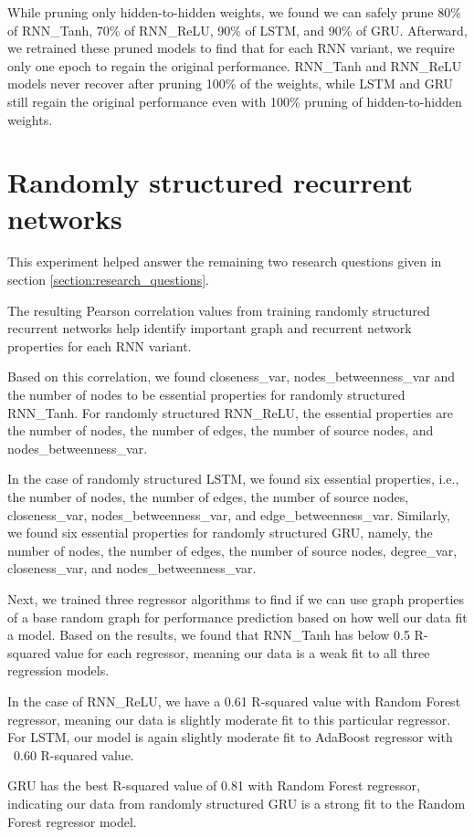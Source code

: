 While pruning only hidden-to-hidden weights, we found we can safely prune 80\% of RNN\_Tanh, 70\% of RNN\_ReLU, 90\% of LSTM, and 90\% of GRU. Afterward, we retrained these pruned models to find that for each RNN variant, we require only one epoch to regain the original performance. RNN\_Tanh and RNN\_ReLU models never recover after pruning 100\% of the weights, while LSTM and GRU still regain the original performance even with 100\% pruning of hidden-to-hidden weights.

\section{Randomly structured recurrent networks}

This experiment helped answer the remaining two research questions given in section \ref{section:research_questions}.

The resulting Pearson correlation values from training randomly structured recurrent networks help identify important graph and recurrent network properties for each RNN variant.

Based on this correlation, we found closeness\_var, nodes\_betweenness\_var and the number of nodes to be essential properties for randomly structured RNN\_Tanh. For randomly structured RNN\_ReLU, the essential properties are the number of nodes, the number of edges, the number of source nodes, and nodes\_betweenness\_var.

In the case of randomly structured LSTM, we found six essential properties, i.e., the number of nodes, the number of edges, the number of source nodes, closeness\_var, nodes\_betweenness\_var, and edge\_betweenness\_var. Similarly, we found six essential properties for randomly structured GRU, namely, the number of nodes, the number of edges, the number of source nodes, degree\_var, closeness\_var, and nodes\_betweenness\_var.

Next, we trained three regressor algorithms to find if we can use graph properties of a base random graph for performance prediction based on how well our data fit a model. Based on the results, we found that RNN\_Tanh has below 0.5 R-squared value for each regressor, meaning our data is a weak fit to all three regression models.

In the case of RNN\_ReLU,  we have a 0.61 R-squared value with Random Forest regressor, meaning our data is slightly moderate fit to this particular regressor. For LSTM, our model is again slightly moderate fit to AdaBoost regressor with ~0.60 R-squared value.

GRU has the best R-squared value of 0.81 with Random Forest regressor, indicating our data from randomly structured GRU is a strong fit to the Random Forest regressor model.